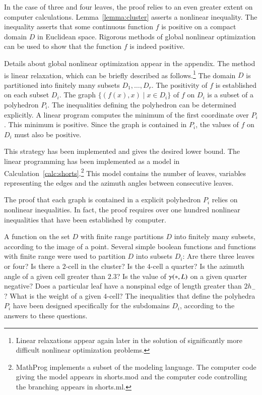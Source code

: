 In the case of three and four leaves, the proof relies to an even
greater extent on computer calculations.  
Lemma~\ref{lemma:cluster} asserts a nonlinear inequality.  The inequality
asserts that some continuous function $f$ is positive on a compact
domain $D$ in Euclidean space.  Rigorous methods of global nonlinear
optimization can be used to show that the function $f$ is indeed
positive.

Details about global nonlinear optimization appear in the appendix.
The method is linear relaxation, which can be briefly described as
follows.\footnote{Linear relaxations appear again later in the
solution of significantly more difficult nonlinear optimization
problems.}  The domain $D$ is partitioned into finitely many subsets
$D_1,\ldots, D_r$.  The positivity of $f$ is established on each
subset $D_i$.  The graph $\{(f(x), x)\mid x\in D_i\}$ of $f$ on $D_i$
is a subset of a polyhedron $P_i$.  The inequalities defining the
polyhedron can be determined explicitly.  A linear program computes
the minimum of the first coordinate over $P_i$.  This minimum is
positive.  Since the graph is contained in $P_i$, the values of $f$ on
$D_i$ must also be positive.

This strategy has been implemented and gives the desired lower bound.
The linear programming has been implemented as a  model
in Calculation~\ref{calc:shorts}.\footnote{MathProg implements a
subset of the  modeling language.  The computer code
giving the model appears in shorts.mod and the computer code
controlling the branching appears in shorts.ml.}  This model
contains the number of leaves, variables representing the edges and
the azimuth angles between consecutive leaves.

The proof that each graph is contained in a explicit polyhedron $P_i$
relies on nonlinear inequalities.  In fact, the proof requires over
one hundred nonlinear inequalities that have been established by
computer.

A function on the set $D$ with finite range partitions $D$ into
finitely many subsets, according to the image of a point.  Several
simple boolean functions and functions with finite range were used to
partition $D$ into subsets $D_i$: Are there three leaves or four?  Is
there a $2$-cell in the cluster?  Is the $4$-cell a quarter?  Is the
azimuth angle of a given cell greater than $2.3$?  Is the value of
$\gamma({*},L)$ on a given quarter negative? Does a particular leaf have a
nonspinal edge of length greater than $2h_-$?  What is the weight of a
given $4$-cell?  The inequalities that define the polyhedra $P_i$ have
been designed specifically for the subdomains $D_i$, according to the
answers to these questions.

